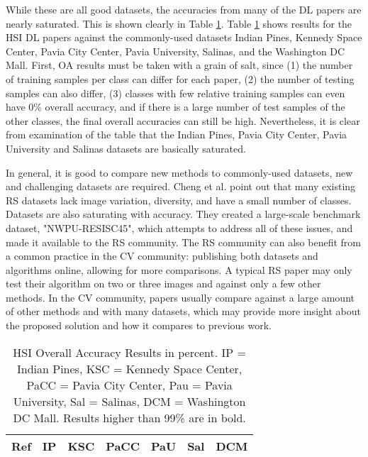 \documentclass[12pt]{spieman}
\begin{document}
\begin{spacing}{1}
While these are all good datasets, the accuracies from many of the DL papers are nearly saturated. This is shown clearly in Table \ref{table:HSI_OA_Results}. Table \ref{table:HSI_OA_Results} shows results for the HSI DL papers against the commonly-used datasets Indian Pines, Kennedy Space Center, Pavia City Center, Pavia University, Salinas, and the Washington DC Mall. First, OA results must be taken with a grain of salt, since (1) the number of training samples per class can differ for each paper, (2) the number of testing samples can also differ, (3) classes with few relative training samples can even have 0\% overall accuracy, and if there is a large number of test samples of the other classes, the final overall accuracies can still be high. Nevertheless, it is clear from examination of the table that the Indian Pines, Pavia City Center, Pavia University and Salinas datasets are basically saturated.

In general, it is good to compare new methods to commonly-used datasets, new and challenging datasets are required. Cheng et al. \cite{Cheng, Cheng2016} point out that many existing RS datasets lack image variation, diversity, and have a small number of classes. Datasets are also saturating with accuracy. They created a large-scale benchmark dataset, "NWPU-RESISC45", which attempts to address all of these issues, and made it available to the RS community. The RS community can also benefit from a common practice in the CV community: publishing both datasets and algorithms online, allowing for more comparisons. A typical RS paper may only test their algorithm on two or three images and against only a few other methods. In the CV community, papers usually compare against a large amount of other methods and with many datasets, which may provide more insight about the proposed solution and how it compares to previous work.

\begin{table}[ht]
\centering

\caption{HSI Overall Accuracy Results in percent. IP = Indian Pines, KSC = Kennedy Space Center, PaCC = Pavia City Center, Pau = Pavia University, Sal = Salinas, DCM = Washington DC Mall. Results higher than 99\% are in bold.}
\label{table:HSI_OA_Results}
\begin{tabular}{|c|c|c|c|c|c|c|}
\hline

Ref     & IP & KSC & PaCC & PaU & Sal & DCM \\ \hline


\end{tabular}
\end{table}
\end{spacing}
\end{document}
